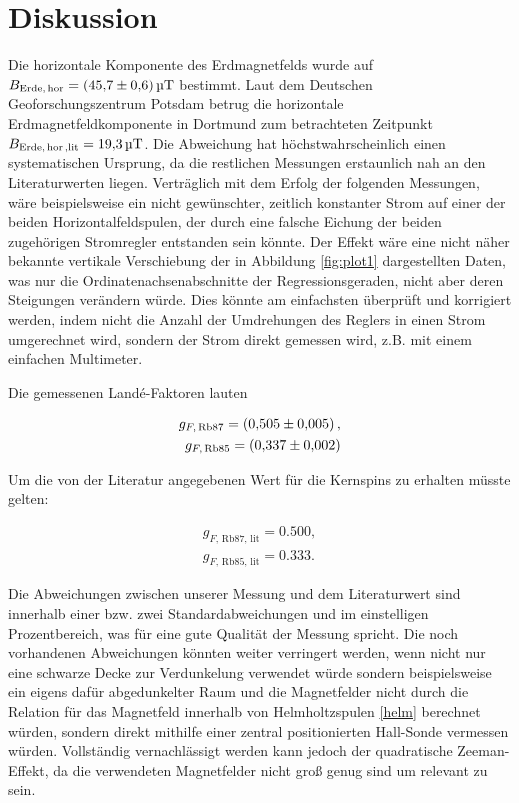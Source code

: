 \section{Diskussion}
\label{sec:Diskussion}

Die horizontale Komponente des Erdmagnetfelds wurde auf $B_\text{Erde,\,hor} = \SI{45.7\pm 0.6}{\micro \tesla}$ bestimmt. Laut dem Deutschen Geoforschungszentrum Potsdam \cite{mag} betrug die horizontale Erdmagnetfeldkomponente in Dortmund zum betrachteten Zeitpunkt $B_\text{Erde,\,hor\,,lit} = \SI{19.3}{\micro \tesla}$. Die Abweichung hat höchstwahrscheinlich einen systematischen Ursprung, da die restlichen Messungen erstaunlich nah an den Literaturwerten liegen. Verträglich mit dem Erfolg der folgenden Messungen, wäre beispielsweise ein nicht gewünschter, zeitlich konstanter Strom auf einer der beiden Horizontalfeldspulen, der durch eine falsche Eichung der beiden zugehörigen Stromregler entstanden sein könnte. Der Effekt wäre eine nicht näher bekannte vertikale Verschiebung der in Abbildung \ref{fig:plot1} dargestellten Daten, was nur die Ordinatenachsenabschnitte der Regressionsgeraden, nicht aber deren Steigungen verändern würde. Dies könnte am einfachsten überprüft und korrigiert werden, indem nicht die Anzahl der Umdrehungen des Reglers in einen Strom umgerechnet wird, sondern der Strom direkt gemessen wird, z.B. mit einem einfachen Multimeter.

Die gemessenen Landé-Faktoren lauten

\begin{eqnarray}
	g_{F,\, \text{Rb}87} = \SI{0.505 \pm 0.005},\\
	g_{F,\, \text{Rb}85} = \SI{0.337 \pm 0.002}.
\end{eqnarray}

Um die von der Literatur \cite{Rb} angegebenen Wert für die Kernspins zu erhalten müsste gelten:

\begin{eqnarray}
g_{F,\, \text{Rb}87, \, \text{lit}} = \SI{0.500},\\
g_{F,\, \text{Rb}85, \, \text{lit}} = \SI{0.333}.
\end{eqnarray}

Die Abweichungen zwischen unserer Messung und dem Literaturwert sind innerhalb einer bzw. zwei Standardabweichungen und im einstelligen Prozentbereich, was für eine gute Qualität der Messung spricht. Die noch vorhandenen Abweichungen könnten weiter verringert werden, wenn nicht nur eine schwarze Decke zur Verdunkelung verwendet würde sondern beispielsweise ein eigens dafür abgedunkelter Raum und die Magnetfelder nicht durch die Relation für das Magnetfeld innerhalb von Helmholtzspulen \eqref{helm} berechnet würden, sondern direkt mithilfe einer zentral positionierten Hall-Sonde vermessen würden. Vollständig vernachlässigt werden kann jedoch der quadratische Zeeman-Effekt, da die verwendeten Magnetfelder nicht groß genug sind um relevant zu sein. 

